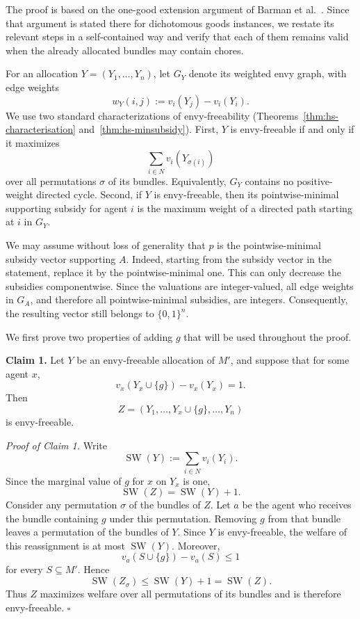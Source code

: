 \documentclass[11pt]{article}
\makeatletter
\theoremstyle{plain}
\theoremstyle{plain}
\renewenvironment{proof}[1][\proofname]{\par
  \pushQED{\qed}%
  \normalfont \topsep6\p@\@plus6\p@\relax
  \trivlist
  \item[\hskip\labelsep\bfseries #1\@addpunct{}]\ignorespaces
}{%
  \popQED\endtrivlist\@endpefalse
}
\makeatother
\begin{document}
\begin{proof}
The proof is based on the one-good extension argument of Barman et al.~\cite{BKNS22}. Since that argument is stated there for dichotomous goods instances, we restate its relevant steps in a self-contained way and verify that each of them remains valid when the already allocated bundles may contain chores.


For an allocation $Y=(Y_1,\ldots,Y_n)$, let $G_Y$ denote its weighted envy graph, with edge weights
\[
w_Y(i,j):=v_i(Y_j)-v_i(Y_i).
\]
We use two standard characterizations of envy-freeability
\cite{HS19,BKNS22} (Theorems~\ref{thm:hs-characterisation} and~\ref{thm:hs-minsubsidy}). First, $Y$ is envy-freeable if and only if it maximizes
\[
\sum_{i\in N}v_i(Y_{\sigma(i)})
\]
over all permutations $\sigma$ of its bundles. Equivalently, $G_Y$ contains no positive-weight directed cycle. Second, if $Y$ is envy-freeable, then its pointwise-minimal supporting subsidy for agent $i$ is the maximum weight of a directed path starting at $i$ in $G_Y$.

We may assume without loss of generality that $p$ is the pointwise-minimal subsidy vector supporting $A$. Indeed, starting from the subsidy vector in the statement, replace it by the pointwise-minimal one. This can only decrease the subsidies componentwise. Since the valuations are integer-valued, all edge weights in $G_A$, and therefore all pointwise-minimal subsidies, are integers. Consequently, the resulting vector still belongs to $\{0,1\}^n$.

We first prove two properties of adding $g$ that will be used throughout the proof.

\medskip
\noindent
\textbf{Claim 1.}
Let $Y$ be an envy-freeable allocation of $M'$, and suppose that for some agent $x$,
\[
v_x(Y_x\cup\{g\})-v_x(Y_x)=1.
\]
Then
\[
Z=(Y_1,\ldots,Y_x\cup\{g\},\ldots,Y_n)
\]
is envy-freeable.

\smallskip
\noindent
\emph{Proof of Claim 1.}
Write
\[
\operatorname{SW}(Y):=\sum_{i\in N}v_i(Y_i).
\]
Since the marginal value of $g$ for $x$ on $Y_x$ is one,
\[
\operatorname{SW}(Z)=\operatorname{SW}(Y)+1.
\]
Consider any permutation $\sigma$ of the bundles of $Z$. Let $a$ be the agent who receives the bundle containing $g$ under this permutation. Removing $g$ from that bundle leaves a permutation of the bundles of $Y$. Since $Y$ is envy-freeable, the welfare of this reassignment is at most
$\operatorname{SW}(Y)$. Moreover,
\[
v_a(S\cup\{g\})-v_a(S)\leq 1
\]
for every $S\subseteq M'$. Hence
\[
\operatorname{SW}(Z_\sigma)
\leq \operatorname{SW}(Y)+1
=\operatorname{SW}(Z).
\]
Thus $Z$ maximizes welfare over all permutations of its bundles and is therefore envy-freeable.
\hfill$\square$


\end{proof}
\end{document}

